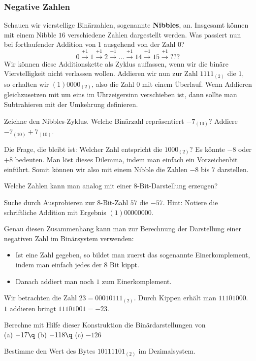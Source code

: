 \documentclass[%
11pt,%
twoside,%
titlepage,%
german,%
headsepline%
]{scrartcl}
\begin{document}
\subsubsection{Negative Zahlen}
Schauen wir vierstellige Binärzahlen, sogenannte \textbf{Nibbles}, an. Insgesamt können mit einem Nibble $16$ verschiedene Zahlen dargestellt werden. Was passiert nun bei fortlaufender Addition von $1$ ausgehend von der Zahl $0$?
$$0\overset{+1}{\longrightarrow}1\overset{+1}{\longrightarrow}2\overset{+1}{\longrightarrow}\dots\overset{+1}{\longrightarrow}14\overset{+1}{\longrightarrow}15\overset{+1}{\longrightarrow}???$$
Wir können diese Additionskette als Zyklus auffassen, wenn wir die binäre Vierstelligkeit nicht verlassen wollen. Addieren wir nun zur Zahl $1111_{(2)}$ die $1$, so erhalten wir $(1)0000_{(2)}$, also die Zahl $0$ mit einem Überlauf. Wenn Addieren gleichzusetzen mit um eins im Uhrzeigersinn verschieben ist, dann sollte man Subtrahieren mit der Umkehrung definieren.
\begin{ueb}
Zeichne den Nibbles-Zyklus. Welche Binärzahl repräsentiert  $-7_{(10)}$? Addiere $-7_{(10)}+7_{(10)}$.
\end{ueb}
Die Frage, die bleibt ist: Welcher Zahl entspricht die $1000_{(2)}$? Es könnte $-8$ oder $+8$ bedeuten. Man löst dieses Dilemma, indem man einfach ein Vorzeichenbit einführt. Somit können wir also mit einem Nibble die Zahlen $-8$ bis $7$ darstellen.
\begin{ueb}
Welche Zahlen kann man analog mit einer $8$-Bit-Darstellung erzeugen?
\end{ueb}
\begin{ueb}
Suche durch Ausprobieren zur $8$-Bit-Zahl $57$ die $-57$. Hint: Notiere die schriftliche Addition mit Ergebnis $(1)00000000$.
\end{ueb}
Genau diesen Zusammenhang kann man zur Berechnung der Darstellung einer negativen Zahl im Binärsystem verwenden:
\begin{itemize}
\item Ist eine Zahl gegeben, so bildet man zuerst das sogenannte Einerkomplement, indem man einfach jedes der $8$ Bit \glqq kippt\grqq.
\item Danach addiert man noch $1$ zum Einerkomplement.
\end{itemize}
\begin{bsp}
Wir betrachten die Zahl $23=00010111_{(2)}$. Durch Kippen erhält man $11101000$. $1$ addieren bringt $11101001=-23$.
\end{bsp}
\begin{ueb}
Berechne mit Hilfe dieser Konstruktion die Binärdarstellungen von\\[2ex]
\hspace*{2.7ex} (a) $-17\q$ (b) $-118\q$ (c) $-126$
\end{ueb}
\begin{ueb}
Bestimme den Wert des Bytes $10111101_{(2)}$ im Dezimalsystem.
\end{ueb}
\end{document}
